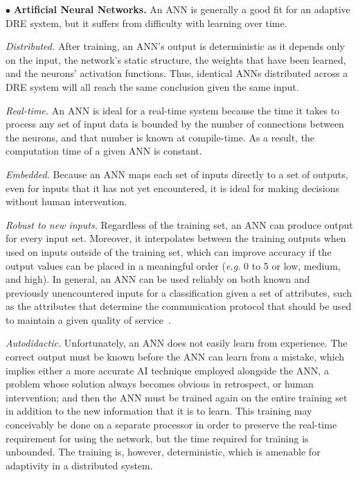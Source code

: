 \documentclass[conference]{IEEEtran}
\begin{document}

$\bullet$ {\bf Artificial Neural Networks.}
An ANN is generally a  good fit for an adaptive DRE system, but it suffers from difficulty with learning over time.

\emph{Distributed.} After training, an ANN's output is deterministic as it depends only on the input, the network's static structure, the weights that have been learned, and the neurons' activation functions. Thus, identical ANNs distributed across a DRE system will all reach the same conclusion given the same input.

\emph{Real-time.} An ANN is ideal for a real-time system because the time it  takes to process any set of input data is bounded by the number of connections between the neurons, and that number  is known at compile-time. As a result, the computation time of a given ANN is constant.

\emph{Embedded.} Because an ANN maps each set of inputs directly to a set of outputs, even for inputs that it has not yet encountered, it is ideal for making decisions without human intervention.

\emph{Robust to new inputs.} Regardless of the training set, an ANN can produce output for every input set. Moreover, it interpolates between the training outputs when used on inputs outside of the training set, which can improve accuracy if the output values can be placed in a meaningful order (\emph{e.g.} 0 to 5 or low, medium, and high). In general, an ANN can be used reliably  on both known and previously unencountered inputs for a classification given a set of attributes, such as the attributes that determine the communication protocol that should be used to maintain a given quality of service~\cite{Hoffert:10}.

\emph{Autodidactic.} Unfortunately, an ANN does not easily learn from experience. The correct output must be known before the ANN can learn from a mistake, which implies either a more accurate AI technique employed alongside the ANN, a problem whose solution always becomes obvious in retrospect, or human intervention; and then the ANN must be trained again on the entire training set in addition to the new information that it is to learn. This training may conceivably be done on a separate processor in order to preserve the real-time requirement for using the network, but the time required for training is unbounded. The training is, however, deterministic, which is amenable for adaptivity in a distributed system.
\end{document}
